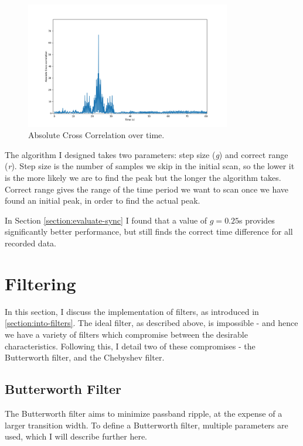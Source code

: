 \documentclass[12pt,a4paper,twoside,openright]{report}
\begin{document}
\begin{figure}[h!]
	\centerline{\includegraphics[width=0.8\textwidth]{figs/cross-correlation.png}}
	\caption{Absolute Cross Correlation over time. }
	\label{fig:cross-correlation}
\end{figure}

The algorithm I designed takes two parameters: step size (\emph{g}) and
correct range (\emph{r}). Step size is the number of samples we skip in the initial scan, so the
lower it is the more likely we are to find the peak but the longer the
algorithm takes. Correct range gives the range of the time period we want to
scan once we have found an initial peak, in order to find the actual peak.

In Section \ref{section:evaluate-sync} I found that a value of \(g=0.25\)s
provides significantly better performance, but still finds the correct time
difference for all recorded data.

\section{Filtering}

In this section, I discuss the implementation of filters, as introduced in
\ref{section:into-filters}. The ideal filter, as described above, is impossible - and 
hence we have a
variety of filters which compromise between the desirable characteristics.
Following this, I detail two of these compromises - the Butterworth filter,
and the Chebyshev filter.


\subsection{Butterworth Filter}

The Butterworth filter aims to minimize passband ripple, at the expense of a
larger transition width. To define a Butterworth filter, multiple parameters
are used, which I will describe further here.
\end{document}
